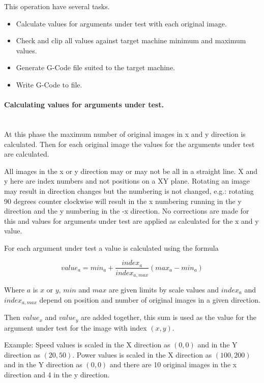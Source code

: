 This operation have several tasks.
\begin{itemize}
    \item Calculate values for arguments under test with each original image.
    \item Check and clip all values against target machine minimum and maximum values.
    \item Generate G-Code file suited to the target machine.
    \item Write G-Code to file.
\end{itemize}

\paragraph{Calculating values for arguments under test.}~\\
At this phase the maximum number of original images in x and y direction is calculated. Then for each
original image the values for the arguments under test are calculated.

All images in the x or y direction may or may not be all in a straight line. X and y here are index numbers and not
positions on a XY plane. Rotating an image may result in direction changes but the numbering is not changed, e.g.:
rotating 90 degrees counter clockwise will result in the x numbering running in the y direction and the y numbering
in the -x direction. No corrections are made for this and values for arguments under test are applied as calculated
for the x and y value.

For each argument under test a value is calculated using the formula

\begin{equation}
    value_a = min_a + \frac{index_a}{index_{a, max}}(max_a - min_a)
\end{equation}

Where $a$ is $x$ or $y$, $min$ and $max$ are given limits by scale values and $index_a$ and $index_{a,max}$ depend on
position and number of original images in a given direction.

Then $value_x$ and $value_y$ are added together, this sum is used as the value for the argument under test for the
image with index $(x, y)$.

Example: Speed values is scaled in the X direction as $(0, 0)$ and in the Y direction as $(20, 50)$. Power values is
scaled in the X direction as $(100, 200)$ and in the Y direction as $(0, 0)$ and there are 10 original images in the
x direction and 4 in the y direction.

